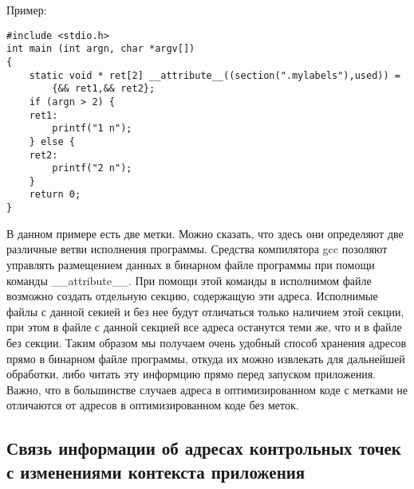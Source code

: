 Пример: 

\bigskip
\begin{lstlisting}
#include <stdio.h>
int main (int argn, char *argv[])
{ 
	static void * ret[2] __attribute__((section(".mylabels"),used)) = 
		{&& ret1,&& ret2};
	if (argn > 2) {
	ret1:
		printf("1 n");
	} else {
	ret2:
		printf("2 n");
	}	
	return 0;
}
\end{lstlisting}

\bigskip
В данном примере есть две метки. Можно сказать, что 
здесь они определяют две различные ветви исполнения 
программы. Средства компилятора gcc позоляют управлять 
размещением данных в бинарном файле программы при помощи 
команды \_\_attribute\_\_. При помощи этой команды в исполнимом 
файле возможно создать отдельную секцию, содержащую эти адреса. 
Исполнимые файлы с данной секией и без нее будут отличаться 
только наличием этой секции, при этом в файле с данной секцией 
все адреса останутся теми же, что и в файле без секции. Таким 
образом мы получаем очень удобный способ хранения адресов прямо 
в бинарном файле программы, откуда их можно извлекать для 
дальнейшей обработки, либо читать эту информцию прямо перед 
запуском приложения. Важно, что в большинстве случаев адреса 
в оптимизированном коде с метками не отличаются от адресов в оптимизированном 
коде без меток. 

\bigskip 
\subsection{Связь информации об адресах контрольных точек с изменениями
	контекста приложения} 

